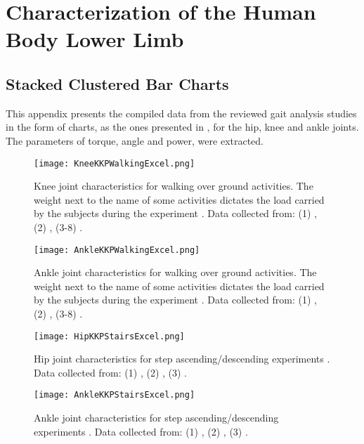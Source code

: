 
\chapter{Characterization of the Human Body Lower Limb} \label{appendixA}
\section{Stacked Clustered Bar Charts}
This appendix presents the compiled data from the reviewed gait analysis studies in the form of charts, as the ones presented in , for the hip, knee and ankle joints. The parameters of torque, angle and power, were extracted.

\begin{figure}[htbp]
\centering
    \texttt{[image: KneeKKPWalkingExcel.png]}
    \caption{Knee joint characteristics for walking over ground activities. The weight next to the name of some activities dictates the load carried by the subjects during the experiment \cite{solis2017characterization}. Data collected from: (1) \cite{bovi2011multiple}, (2) \cite{lee2008biomechanics}, (3-8) \cite{han2011biomechanical}.}
    \label{fig:kneeKKPWalking}
\end{figure}

\begin{figure}[htbp]
\centering
    \texttt{[image: AnkleKKPWalkingExcel.png]}
    \caption{Ankle joint characteristics for walking over ground activities. The weight next to the name of some activities dictates the load carried by the subjects during the experiment \cite{solis2017characterization}. Data collected from: (1) \cite{bovi2011multiple}, (2) \cite{lee2008biomechanics}, (3-8) \cite{han2011biomechanical}.}
    \label{fig:ankleKKPWalking}
\end{figure}

\begin{figure}[htbp]
    \centering
    \texttt{[image: HipKKPStairsExcel.png]}
    \caption{Hip joint characteristics for step ascending/descending experiments \cite{solis2017characterization}. Data collected from: (1) \cite{protopapadaki2007hip}, (2) \cite{riener2002stair}, (3) \cite{reid2007knee}. }
    \label{fig:hipKKPStairs}
\end{figure}

\begin{figure}[htbp]
    \centering
    \texttt{[image: AnkleKKPStairsExcel.png]}
    \caption{Ankle joint characteristics for step ascending/descending experiments \cite{solis2017characterization}. Data collected from: (1) \cite{protopapadaki2007hip}, (2) \cite{riener2002stair}, (3) \cite{reid2007knee}. }
    \label{fig:ankleKKPStairs}
\end{figure}

